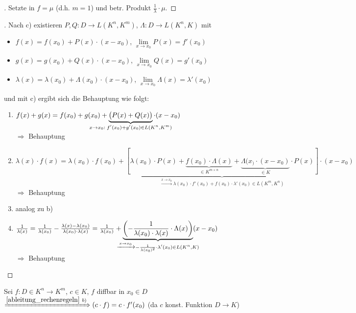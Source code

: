 \begin{proof}[]
	Setzte in  $f=\mu$ (d.h. $m=1$) und betr. Produkt $\frac{1}{\lambda}\cdot \mu$.
\end{proof}

\begin{proof}[]
	Nach  c) existieren $P,Q: D\to L(K^n, K^m)$, $\Lambda:D\to L(K^n, K)$ mit
\begin{itemize}[topsep=\dimexpr -\baselineskip / 3\relax]
	\item $f(x) = f(x_0) + P(x) \cdot (x - x_0)$, $\lim\limits_{x\to x_0} P(x) = f'(x_0)$
	\item $g(x) = g(x_0) + Q(x) \cdot (x - x_0)$, $\lim\limits_{x\to x_0} Q(x) = g'(x_0)$
	\item $\lambda(x) = \lambda(x_0) + \Lambda(x_0) \cdot (x - x_0)$, $\lim\limits_{x\to x_0} \Lambda(x) = \lambda'(x_0)$
\end{itemize}
und mit  c) ergibt sich die Behauptung wie folgt:
\begin{enumerate}[label={\alph*)}]
	\item $f(x) + g(x) = f(x_0) + g(x_0) + \underbrace{\big( P(x) + Q(x) \big)}_{\mathclap{x\to x_0:\; f'(x_0) + g'(x_0)\in L(K^n, K^m)}}\cdot (x - x_0)$ \\
	$\Rightarrow$ Behauptung
	\item $\lambda(x)\cdot f(x) = \lambda(x_0) \cdot f(x_0) + \underbrace{\left[ \lambda(x_0) \cdot P(x) + \underbrace{f(x_0)\cdot \Lambda(x)}_{\in K^{m\times n}} + \underbrace{\Lambda(x_) \cdot (x - x_0)}_{\in K} \cdot P(x) \right]}_{\xrightarrow{x\to x_0}\lambda(x_0)\cdot f'(x_0) + f(x_0)\cdot \lambda'(x_0)\in L(K^m, K^n)} \cdot (x - x_0)$ \\
	$\Rightarrow$ Behauptung
	\item analog zu b)
	\item $\frac{1}{\lambda(x)} = \frac{1}{\lambda(x_0)} - \frac{\lambda(x) - \lambda(x_0)}{\lambda(x_0)\cdot \lambda(x)} = \frac{1}{\lambda(x_0)} + \underbrace{\left( - \frac{1}{\lambda(x_0)\cdot\lambda(x)}\cdot \Lambda(x)\right)}_{\mathclap{\xrightarrow{x\to x_0}-\frac{1}{\lambda(x_0)^2}\cdot \lambda'(x_0)\in L(K^n, K)}} (x - x_0)$\\
	$\Rightarrow$ Behauptung
\end{enumerate}
\end{proof}

\begin{example}
	Sei $f:D\in K^n\to K^m$, $c\in K$, $f$ \gls{diffbar} in $x_0\in D$\\
	$\xRightarrow{\ref{ableitung_rechenregeln}\ b)} (c\cdot f) = c\cdot f'(x_0)$ (da $c$ konst. Funktion $D\to K$)
\end{example}

